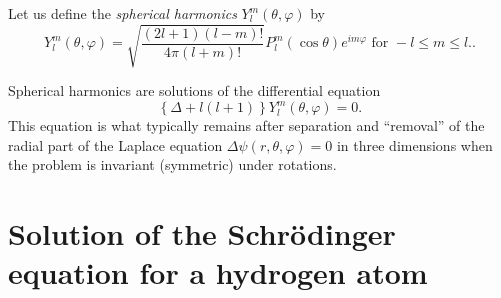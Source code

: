 Let us define the {\em spherical harmonics} $Y_l^m (\theta ,\varphi )$ by
\begin{equation}
Y_l^m (\theta ,\varphi ) =\sqrt{\frac{(2l+1)(l-m)!}{4\pi (l+m)!} }
P_l^m(\cos \theta )e^{im\varphi }\textrm{ for } -l\le m\le l.
.
\label{2014-m-ch-sf-sh}
\end{equation}

Spherical harmonics are solutions of the differential equation
\begin{equation}
\left\{
\Delta + l(l+1)
\right\}
Y_l^m (\theta ,\varphi ) =0
.
\end{equation}
This equation is what typically remains after separation and ``removal'' of the
radial part of the Laplace equation $\Delta \psi(r,\theta ,\varphi)=0$ in three dimensions
when the problem is invariant (symmetric) under rotations.




\section{Solution of the Schr\"odinger equation for a hydrogen atom}

